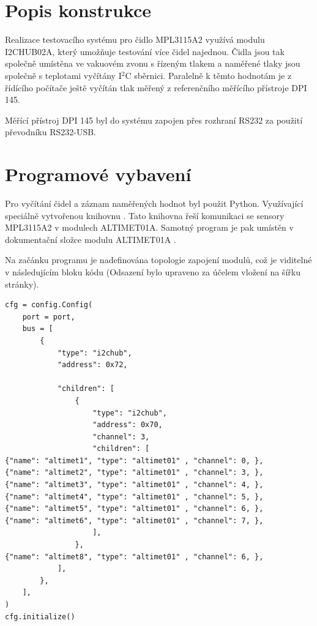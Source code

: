 \documentclass[12pt,a4paper,oneside]{article}
\begin{document}
\newpage
\tableofcontents
\newpage

\section{Popis konstrukce}

Realizace testovacího systému pro čidlo MPL3115A2 využívá modulu I2CHUB02A, který umožňuje testování více čidel najednou. Čidla jsou tak společně umístěna ve vakuovém zvonu s řízeným tlakem a naměřené tlaky jsou společně s teplotami vyčítány I$^2$C sběrnici. Paralelně k těmto hodnotám je z řídícího počítače ještě vyčítán tlak měřený z referenčního měřícího přístroje DPI 145. 

Měřící přístroj DPI 145 byl do systému zapojen přes rozhraní RS232 za použití převodníku  RS232-USB. 

\section{Programové vybavení}

Pro vyčítání čidel a záznam naměřených hodnot byl použit Python. Využívající speciálně vytvořenou knihovnu  \cite{MLAB-I2c-modules}. Tato knihovna řeší komunikaci se sensory MPL3115A2 v modulech ALTIMET01A. Samotný program je pak umístěn v dokumentační složce modulu ALTIMET01A \cite{data_logger}.

Na začánku programu je nadefinována topologie zapojení modulů, což je viditelné v následujícím bloku kódu (Odsazení bylo upraveno za účelem vložení na šířku stránky).

\lstset{language=Python}
\begin{lstlisting}[frame=single]
cfg = config.Config(
    port = port,
    bus = [
        {
            "type": "i2chub",
            "address": 0x72,
            
            "children": [
                {
                    "type": "i2chub",
                    "address": 0x70,
                    "channel": 3,
                    "children": [
{"name": "altimet1", "type": "altimet01" , "channel": 0, },   
{"name": "altimet2", "type": "altimet01" , "channel": 3, },   
{"name": "altimet3", "type": "altimet01" , "channel": 4, },   
{"name": "altimet4", "type": "altimet01" , "channel": 5, },   
{"name": "altimet5", "type": "altimet01" , "channel": 6, },   
{"name": "altimet6", "type": "altimet01" , "channel": 7, },   
                    ], 
                },
{"name": "altimet8", "type": "altimet01" , "channel": 6, },
            ],
        },
    ],
)
cfg.initialize()
\end{lstlisting}
\end{document}
